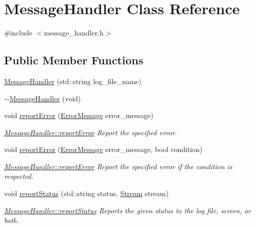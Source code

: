 \hypertarget{classMessageHandler}{}\section{Message\+Handler Class Reference}
\label{classMessageHandler}


{\ttfamily \#include $<$message\+\_\+handler.\+h$>$}

\subsection*{Public Member Functions}
\begin{DoxyCompactItemize}
\item 
\hyperlink{classMessageHandler_a5a8ca5b0e6fa1e9293bfc0d972177881}{Message\+Handler} (std\+::string log\+\_\+file\+\_\+name)
\item 
\hyperlink{classMessageHandler_a6bee5eb7f64fe5360cada61353516a8b}{$\sim$\+Message\+Handler} (void)
\item 
void \hyperlink{classMessageHandler_a10772170f398c739220681f6efbc577b}{report\+Error} (\hyperlink{error__messages_8h_af8d1d72c71dcf239d1bf17fe2a760395}{Error\+Message} error\+\_\+message)
\begin{DoxyCompactList}\small\item\em \hyperlink{classMessageHandler_a10772170f398c739220681f6efbc577b}{Message\+Handler\+::report\+Error} Report the specified error. \end{DoxyCompactList}\item 
void \hyperlink{classMessageHandler_a6b28b6a3515af4531583d35bb6bf5a9f}{report\+Error} (\hyperlink{error__messages_8h_af8d1d72c71dcf239d1bf17fe2a760395}{Error\+Message} error\+\_\+message, bool condition)
\begin{DoxyCompactList}\small\item\em \hyperlink{classMessageHandler_a10772170f398c739220681f6efbc577b}{Message\+Handler\+::report\+Error} Report the specified error if the condition is respected. \end{DoxyCompactList}\item 
void \hyperlink{classMessageHandler_a3c896ccad36637cb0423a5e11ccfe6a5}{report\+Status} (std\+::string status, \hyperlink{message__handler_8h_a0b8b584f5fb32277059bc4e6b9bcd6f0}{Stream} stream)
\begin{DoxyCompactList}\small\item\em \hyperlink{classMessageHandler_a3c896ccad36637cb0423a5e11ccfe6a5}{Message\+Handler\+::report\+Status} Reports the given status to the log file, screen, or both. \end{DoxyCompactList}\end{DoxyCompactItemize}


